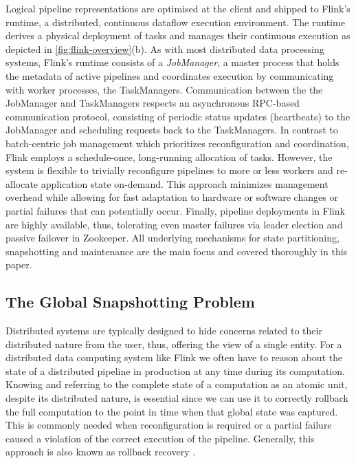 Logical pipeline representations are optimised at the client and shipped to Flink's runtime, a distributed, continuous dataflow execution environment. The runtime derives a physical deployment of tasks and manages their continuous execution as depicted in \autoref{fig:flink-overview}(b). As with most distributed data processing systems, Flink's runtime consists of a \emph{JobManager}, a master process that holds the metadata of active pipelines and coordinates execution by communicating with worker processes, the TaskManagers. Communication between the the JobManager and TaskManagers respects an asynchronous RPC-based communication protocol, consisting of periodic status updates (heartbeats) to the JobManager and scheduling requests back to the TaskManagers. In contrast to batch-centric job management \cite{zaharia2012discretized,venkataramandrizzle} which prioritizes reconfiguration and coordination, Flink employs a schedule-once, long-running allocation of tasks. However, the system is flexible to trivially reconfigure pipelines to more or less workers and re-allocate application state on-demand. This approach minimizes management overhead while allowing for fast adaptation to hardware or software changes or partial failures that can potentially occur. Finally, pipeline deployments in Flink are highly available, thus, tolerating even master failures via leader election and passive failover in Zookeeper. All underlying mechanisms for state partitioning, snapshotting and maintenance are the main focus and covered thoroughly in this paper.


\subsection{The Global Snapshotting Problem}

Distributed systems are typically designed to hide concerns related to their distributed nature from the user, thus, offering the view of a single entity. For a distributed data computing system like Flink we often have to reason about the state of a distributed pipeline in production at any time during its computation. Knowing and referring to the complete state of a computation as an atomic unit, despite its distributed nature, is essential since we can use it to correctly rollback the full computation to the point in time when that global state was captured. This is commonly needed when reconfiguration is required or a partial failure caused a violation of the correct execution of the pipeline. Generally, this approach is also known as rollback recovery \cite{elnozahy2002survey}. 

